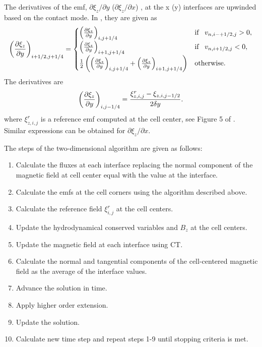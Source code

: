 The derivatives of the emf, $\partial \xi_z / \partial y$ ($\partial \xi_z / \partial x$) , at the x (y) interfaces are upwinded based on the contact mode.  In \citep{Gardiner:2005}, they are given as
\begin{gather}
\label{eqn:emf_upwind}
\left( \frac{\partial \xi_z}{\partial y}\right)_{i+1/2,j+1/4} =
\begin{cases}
\left( \frac{\partial \xi_z}{\partial y}\right)_{i,j+1/4} & \text{if}\;\;\; v_{n,i-+1/2,j} > 0 , \\
\left( \frac{\partial \xi_z}{\partial y}\right)_{i+1,j+1/4} & \text{if}\;\;\; v_{n,i+1/2,j} < 0 , \\
\frac{1}{2}\left(\left( \frac{\partial \xi_z}{\partial y}\right)_{i,j+1/4} + \left( \frac{\partial \xi_z}{\partial y}\right)_{i+1,j+1/4} \right)& \text{otherwise}.
\end{cases}
\end{gather}
The derivatives are 
\begin{gather}
\left( \frac{\partial \xi_z}{\partial y} \right)_{i,j-1/4} = \frac{\xi^r_{z,i,j} - \xi_{z,i,j-1/2}}{2\delta y}.
\end{gather}
where $\xi^r_{z,i,j}$ is a reference emf computed at the cell center, see Figure 5 of \citep{Stone:2008}.  Similar expressions can be obtained for $\partial \xi_z / \partial x$. 

The steps of the two-dimensional algorithm are given as follows:
\begin{enumerate}
\item Calculate the fluxes at each interface replacing the normal component of the magnetic field at cell center equal with the value at the interface.
\item Calculate the emfs at the cell corners using the algorithm described above.
\item Calculate the reference field $\xi^r_{i,j}$ at the cell centers.
\item Update the hydrodynamical conserved variables and $B_z$ at the cell centers.
\item Update the magnetic field at each interface using CT.
\item Calculate the normal and tangential components of the cell-centered magnetic field as the average of the interface values.
\item Advance the solution in time.
\item Apply higher order extension.
\item Update the solution.
\item Calculate new time step and repeat steps 1-9 until stopping criteria is met.
\end{enumerate}

